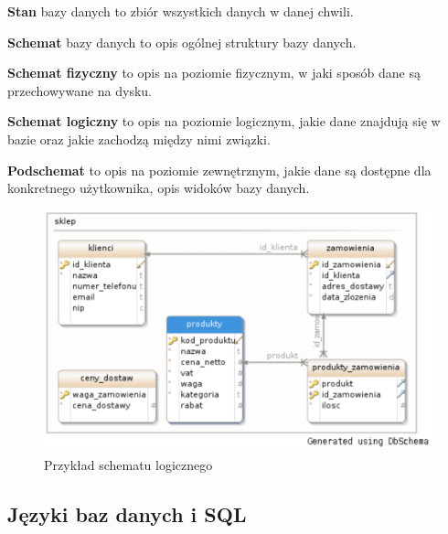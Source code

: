 \begin{definition}
    \textbf{Stan} bazy danych to zbiór wszystkich danych w danej chwili.
\end{definition}

\begin{definition}
    \textbf{Schemat} bazy danych to opis ogólnej struktury bazy danych.
\end{definition}

\begin{definition}
    \textbf{Schemat fizyczny} to opis na poziomie fizycznym, w jaki sposób dane są przechowywane na dysku.
\end{definition}

\begin{definition}
    \textbf{Schemat logiczny} to opis na poziomie logicznym, jakie dane znajdują się w bazie oraz jakie zachodzą między nimi związki.
\end{definition}

\begin{definition}
    \textbf{Podschemat} to opis na poziomie zewnętrznym, jakie dane są dostępne dla konkretnego użytkownika, opis widoków bazy danych.
\end{definition}

\begin{figure}[H]
    \centering
    \includegraphics[scale=0.50]{images/podstawowe/schemat-logiczny.png}
    \caption{Przykład schematu logicznego}
\end{figure}

\subsection{Języki baz danych i SQL}

